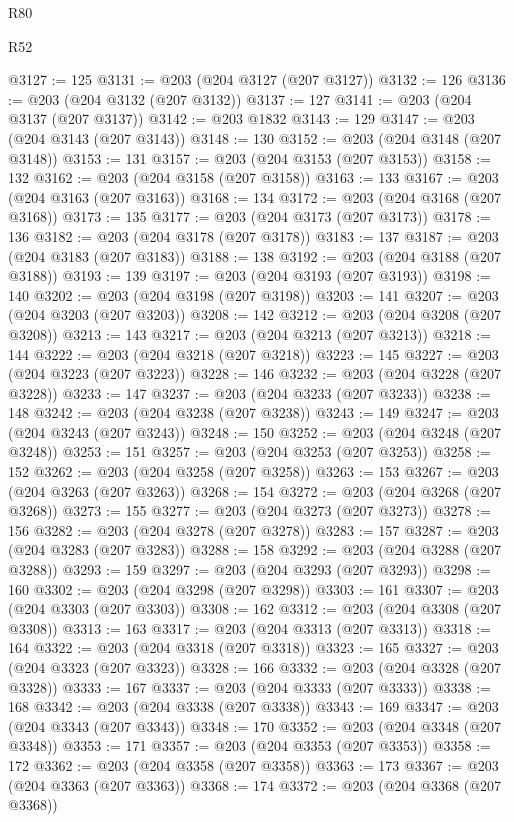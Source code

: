 \begin{lexlean}{R80}
\begin{lexlean}{R52}
\begin{coremodule}
{{{{{{{{{{{{{{{{{{{{{{{{{{{{{{{{{{{{{{{{{{{{{{{{{{{{{{{{{{{{{{{{{{{{{{{{{{{{{{{{{{{{{{{{{{{{{{{{{{{{{{{{{{{{{{{{{{{{{{{{{{{{{{{{{{{{{{{{{{{{{{{{{{{{{{{{{{{{{{{{{{{{{{{{{{{{{{{{{{{{{{{{{{{{{{{{{{{{{{@3127 := 125
@3131 := @203 (@204 @3127 (@207 @3127))
@3132 := 126
@3136 := @203 (@204 @3132 (@207 @3132))
@3137 := 127
@3141 := @203 (@204 @3137 (@207 @3137))
@3142 := @203 @1832
@3143 := 129
@3147 := @203 (@204 @3143 (@207 @3143))
@3148 := 130
@3152 := @203 (@204 @3148 (@207 @3148))
@3153 := 131
@3157 := @203 (@204 @3153 (@207 @3153))
@3158 := 132
@3162 := @203 (@204 @3158 (@207 @3158))
@3163 := 133
@3167 := @203 (@204 @3163 (@207 @3163))
@3168 := 134
@3172 := @203 (@204 @3168 (@207 @3168))
@3173 := 135
@3177 := @203 (@204 @3173 (@207 @3173))
@3178 := 136
@3182 := @203 (@204 @3178 (@207 @3178))
@3183 := 137
@3187 := @203 (@204 @3183 (@207 @3183))
@3188 := 138
@3192 := @203 (@204 @3188 (@207 @3188))
@3193 := 139
@3197 := @203 (@204 @3193 (@207 @3193))
@3198 := 140
@3202 := @203 (@204 @3198 (@207 @3198))
@3203 := 141
@3207 := @203 (@204 @3203 (@207 @3203))
@3208 := 142
@3212 := @203 (@204 @3208 (@207 @3208))
@3213 := 143
@3217 := @203 (@204 @3213 (@207 @3213))
@3218 := 144
@3222 := @203 (@204 @3218 (@207 @3218))
@3223 := 145
@3227 := @203 (@204 @3223 (@207 @3223))
@3228 := 146
@3232 := @203 (@204 @3228 (@207 @3228))
@3233 := 147
@3237 := @203 (@204 @3233 (@207 @3233))
@3238 := 148
@3242 := @203 (@204 @3238 (@207 @3238))
@3243 := 149
@3247 := @203 (@204 @3243 (@207 @3243))
@3248 := 150
@3252 := @203 (@204 @3248 (@207 @3248))
@3253 := 151
@3257 := @203 (@204 @3253 (@207 @3253))
@3258 := 152
@3262 := @203 (@204 @3258 (@207 @3258))
@3263 := 153
@3267 := @203 (@204 @3263 (@207 @3263))
@3268 := 154
@3272 := @203 (@204 @3268 (@207 @3268))
@3273 := 155
@3277 := @203 (@204 @3273 (@207 @3273))
@3278 := 156
@3282 := @203 (@204 @3278 (@207 @3278))
@3283 := 157
@3287 := @203 (@204 @3283 (@207 @3283))
@3288 := 158
@3292 := @203 (@204 @3288 (@207 @3288))
@3293 := 159
@3297 := @203 (@204 @3293 (@207 @3293))
@3298 := 160
@3302 := @203 (@204 @3298 (@207 @3298))
@3303 := 161
@3307 := @203 (@204 @3303 (@207 @3303))
@3308 := 162
@3312 := @203 (@204 @3308 (@207 @3308))
@3313 := 163
@3317 := @203 (@204 @3313 (@207 @3313))
@3318 := 164
@3322 := @203 (@204 @3318 (@207 @3318))
@3323 := 165
@3327 := @203 (@204 @3323 (@207 @3323))
@3328 := 166
@3332 := @203 (@204 @3328 (@207 @3328))
@3333 := 167
@3337 := @203 (@204 @3333 (@207 @3333))
@3338 := 168
@3342 := @203 (@204 @3338 (@207 @3338))
@3343 := 169
@3347 := @203 (@204 @3343 (@207 @3343))
@3348 := 170
@3352 := @203 (@204 @3348 (@207 @3348))
@3353 := 171
@3357 := @203 (@204 @3353 (@207 @3353))
@3358 := 172
@3362 := @203 (@204 @3358 (@207 @3358))
@3363 := 173
@3367 := @203 (@204 @3363 (@207 @3363))
@3368 := 174
@3372 := @203 (@204 @3368 (@207 @3368))
}}}}}}}}}}}}}}}}}}}}}}}}}}}}}}}}}}}}}}}}}}}}}}}}}}}}}}}}}}}}}}}}}}}}}}}}}}}}}}}}}}}}}}}}}}}}}}}}}}}}}}}}}}}}}}}}}}}}}}}}}}}}}}}}}}}}}}}}}}}}}}}}}}}}}}}}}}}}}}}}}}}}}}}}}}}}}}}}}}}}}}}}}}}}}}}}}}}}}}
\end{coremodule}
\end{lexlean}
\end{lexlean}
